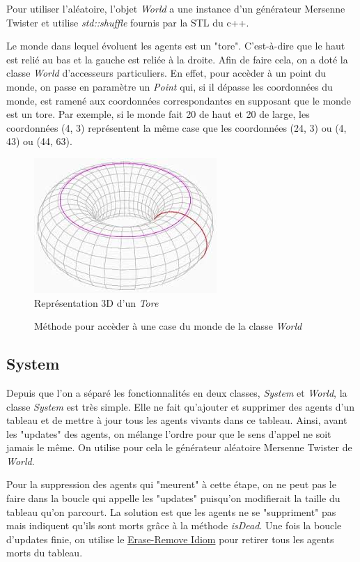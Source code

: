 \documentclass[a4paper, 12pt]{article}
\begin{document}
Pour utiliser l'aléatoire, l'objet \emph{World} a une instance d'un générateur Mersenne Twister et utilise \emph{std::shuffle} fournis par la STL du c++.

Le monde dans lequel évoluent les agents est un "tore". C'est-à-dire que le haut est relié au bas et la gauche est reliée à la droite.
Afin de faire cela, on a doté la classe \emph{World} d'accesseurs particuliers. En effet, pour accèder à un point du monde, on passe
en paramètre un \emph{Point} qui, si il dépasse les coordonnées du monde, est ramené aux coordonnées correspondantes en supposant que le
monde est un tore. Par exemple, si le monde fait 20 de haut et 20 de large, les coordonnées (4, 3) représentent la même case que les
coordonnées (24, 3) ou (4, 43) ou (44, 63).
\begin{figure}[!h]
  \centering
  \caption{Représentation 3D d'un \emph{Tore}}
  \includegraphics[scale=1]{img/tore.jpeg}
\end{figure}
\begin{figure}[!h]
  \centering
  \caption{Méthode pour accèder à une case du monde de la classe \emph{World}}
  
\end{figure}

\subsection{System}
Depuis que l'on a séparé les fonctionnalités en deux classes, \emph{System} et \emph{World}, la classe \emph{System} est très simple.
Elle ne fait qu'ajouter et supprimer des agents d'un tableau et de mettre à jour tous les agents vivants
dans ce tableau.
Ainsi, avant les "updates" des agents, on mélange l'ordre pour que le sens d'appel ne soit jamais le même. On utilise pour cela le générateur
aléatoire Mersenne Twister de \emph{World}.

Pour la suppression des agents qui "meurent" à cette étape, on ne peut pas le faire dans la boucle qui appelle les "updates" puisqu'on
modifierait la taille du tableau qu'on parcourt. La solution est que les agents ne se "suppriment" pas mais indiquent qu'ils sont morts
grâce à la méthode \emph{isDead}. Une fois la boucle d'updates finie, on utilise le \href{https://en.wikipedia.org/wiki/Erase%E2%80%93remove_idiom}{Erase-Remove Idiom}
pour retirer tous les agents morts du tableau.
\end{document}
